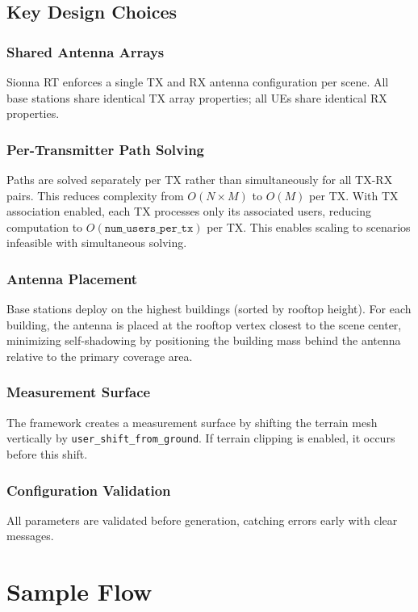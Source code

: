 \documentclass{article}
\begin{document}
\subsection{Key Design Choices}

\subsubsection{Shared Antenna Arrays}
Sionna RT enforces a single TX and RX antenna configuration per scene. All base stations share identical TX array properties; all UEs share identical RX properties.

\subsubsection{Per-Transmitter Path Solving}
Paths are solved separately per TX rather than simultaneously for all TX-RX pairs. This reduces complexity from $O(N \times M)$ to $O(M)$ per TX. With TX association enabled, each TX processes only its associated users, reducing computation to $O(\texttt{num\_users\_per\_tx})$ per TX. This enables scaling to scenarios infeasible with simultaneous solving.

\subsubsection{Antenna Placement}
Base stations deploy on the highest buildings (sorted by rooftop height). For each building, the antenna is placed at the rooftop vertex closest to the scene center, minimizing self-shadowing by positioning the building mass behind the antenna relative to the primary coverage area.

\subsubsection{Measurement Surface}
The framework creates a measurement surface by shifting the terrain mesh vertically by \texttt{user\_shift\_from\_ground}. If terrain clipping is enabled, it occurs before this shift.

\subsubsection{Configuration Validation}
All parameters are validated before generation, catching errors early with clear messages.

\clearpage
\section{Sample Flow}
\end{document}
